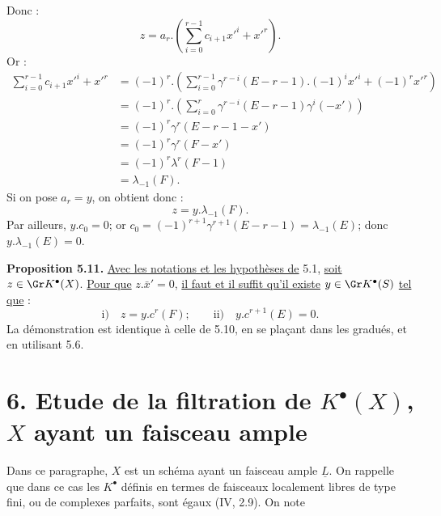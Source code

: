 
Donc :
\[
  z=a_r.\left(\sum_{i=0}^{r-1}c_{i+1}{x'}^i+{x'}^r\right).
\]
Or :
\[
\begin{aligned}
\sum_{i=0}^{r-1}c_{i+1}{x'}^i+{x'}^r
&=(-1)^r.\left(\sum_{i=0}^{r-1}\gamma^{r-i}(E-r-1).(-1)^i{x'}^i+(-1)^r{x'}^r\right)\\
&=(-1)^r.\left(\sum_{i=0}^{r}\gamma^{r-i}(E-r-1)\gamma^i(-x')\right)\\
&=(-1)^r\gamma^r(E-r-1-x')\\
&=(-1)^r\gamma^r(F-x')\\
&=(-1)^r\lambda^r(F-1)\\
&=\lambda_{-1}(F).
\end{aligned}
\]
Si on pose $a_r=y$, on obtient donc :
\[
  z=y.\lambda_{-1}(F).
\]
Par ailleurs, $y.c_0=0$; or $c_0=(-1)^{r+1}\gamma^{r+1}(E-r-1)=\lambda_{-1}(E)$; donc $y.\lambda_{-1}(E)=0$.

\textbf{Proposition 5.11.} \uline{Avec les notations et les hypothèses de} 5.1, \uline{soit} $z\in \Gr K^{\bullet}(X)$. \uline{Pour que} $z.\bar x'=0$, \uline{il faut et il suffit qu'il existe} $y\in \Gr K^{\bullet}(S)$ \uline{tel que} :
\[
  \text{i)}\quad z=y.c^r(F);
  \qquad
  \text{ii)}\quad y.c^{r+1}(E)=0.
\]
La démonstration est identique à celle de 5.10, en se plaçant dans les gradués, et en utilisant 5.6.


\section*{6. Etude de la filtration de \texorpdfstring{$K^{\bullet}(X)$}{K^{\bullet}(X)}, $X$ ayant un faisceau ample}

Dans ce paragraphe, $X$ est un schéma ayant un faisceau ample $\underline{L}$. On rappelle que dans ce cas les $K^{\bullet}$ définis en termes de faisceaux localement libres de type fini, ou de complexes parfaits, sont égaux (IV, 2.9). On note
